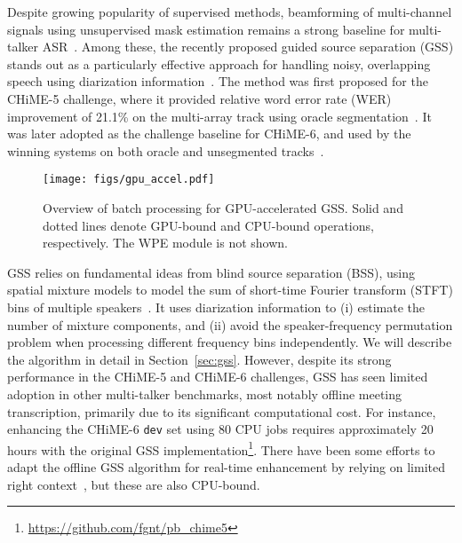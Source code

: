 \documentclass[a4paper]{article}
\begin{document}
Despite growing popularity of supervised methods, beamforming of multi-channel signals using unsupervised mask estimation remains a strong baseline for multi-talker ASR~\cite{Scheibler2020FastAS,Saijo2022SpatialLF,Ueda2021LowLO,Ikeshita2019AUF}. Among these, the recently proposed guided source separation (GSS) stands out as a particularly effective approach for handling noisy, overlapping speech using diarization information~\cite{Boeddeker2018FrontendPF,Kanda2019GuidedSS}. The method was first proposed for the CHiME-5 challenge, where it provided relative word error rate (WER) improvement of 21.1\% on the multi-array track using oracle segmentation~\cite{Boeddeker2018FrontendPF}. It was later adopted as the challenge baseline for CHiME-6, and used by the winning systems on both oracle and unsegmented tracks~\cite{Watanabe2020CHiME6CT,Arora2020TheJM,Chen2020ImprovedGS,Medennikov2020TheSS}.

\begin{figure}[t]
    \centering
    \texttt{[image: figs/gpu\_accel.pdf]}
    \vspace{-1.5em}
    \caption{Overview of batch processing for GPU-accelerated GSS. Solid and dotted lines denote GPU-bound and CPU-bound operations, respectively. The WPE module is not shown.}
    \label{fig:batch}
    \vspace{-0.8em}
\end{figure}

GSS relies on fundamental ideas from blind source separation (BSS), using spatial mixture models to model the sum of short-time Fourier transform (STFT) bins of multiple speakers~\cite{Comon2010HandbookOB}. It uses diarization information to (i) estimate the number of mixture components, and (ii) avoid the speaker-frequency permutation problem when processing different frequency bins independently. We will describe the algorithm in detail in Section~\ref{sec:gss}. However, despite its strong performance in the CHiME-5 and CHiME-6 challenges, GSS has seen limited adoption in other multi-talker benchmarks, most notably offline meeting transcription, primarily due to its significant computational cost. For instance, enhancing the CHiME-6 \texttt{dev} set using 80 CPU jobs requires approximately 20 hours with the original GSS implementation\footnote{\url{https://github.com/fgnt/pb_chime5}}. There have been some efforts to adapt the offline GSS algorithm for real-time enhancement by relying on limited right context~\cite{Horiguchi2021BlockOnlineGS}, but these are also CPU-bound.
\end{document}

